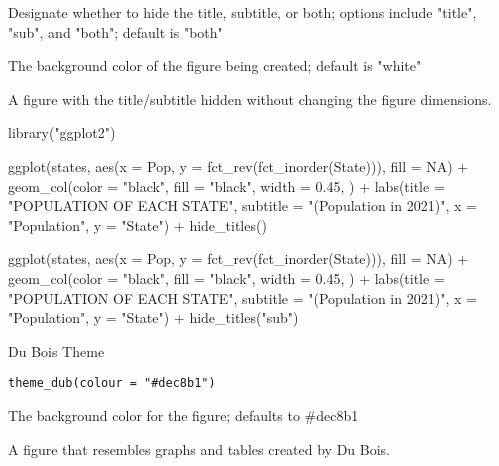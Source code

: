 \documentclass[a4paper]{book}
\begin{document}
%
\begin{Arguments}
\begin{ldescription}
\item[\code{hide}] Designate whether to hide the title, subtitle, or both; options include "title", "sub", and "both"; default is "both"

\item[\code{colour}] The background color of the figure being created; default is "white"
\end{ldescription}
\end{Arguments}
%
\begin{Value}
A figure with the title/subtitle hidden without changing the figure dimensions.
\end{Value}
%
\begin{Examples}
\begin{ExampleCode}
library("ggplot2")

ggplot(states, aes(x = Pop, y = fct_rev(fct_inorder(State))), fill = NA) +
geom_col(color = "black", fill = "black", width = 0.45, ) +
labs(title = "POPULATION OF EACH STATE",
    subtitle = "(Population in 2021)",
    x = "Population",
    y = "State") +
hide_titles()

ggplot(states, aes(x = Pop, y = fct_rev(fct_inorder(State))), fill = NA) +
geom_col(color = "black", fill = "black", width = 0.45, ) +
labs(title = "POPULATION OF EACH STATE",
    subtitle = "(Population in 2021)",
    x = "Population",
    y = "State") +
hide_titles("sub")
\end{ExampleCode}
\end{Examples}
%
\begin{Description}\relax
Du Bois Theme
\end{Description}
%
\begin{Usage}
\begin{verbatim}
theme_dub(colour = "#dec8b1")
\end{verbatim}
\end{Usage}
%
\begin{Arguments}
\begin{ldescription}
\item[\code{colour}] The background color for the figure; defaults to \#dec8b1
\end{ldescription}
\end{Arguments}
%
\begin{Value}
A figure that resembles graphs and tables created by Du Bois.
\end{Value}
\end{document}
